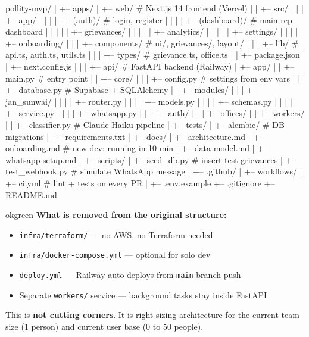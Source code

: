 \documentclass[12pt, a4paper]{article}
\begin{document}
\begin{treebox}
pollity-mvp/
|
+-- apps/
|   +-- web/                     # Next.js 14 frontend (Vercel)
|   |   +-- src/
|   |   |   +-- app/
|   |   |   |   +-- (auth)/      # login, register
|   |   |   |   +-- (dashboard)/ # main rep dashboard
|   |   |   |   |   +-- grievances/
|   |   |   |   |   +-- analytics/
|   |   |   |   |   +-- settings/
|   |   |   |   +-- onboarding/
|   |   |   +-- components/      # ui/, grievances/, layout/
|   |   |   +-- lib/             # api.ts, auth.ts, utils.ts
|   |   |   +-- types/           # grievance.ts, office.ts
|   |   +-- package.json
|   |   +-- next.config.js
|   |
|   +-- api/                     # FastAPI backend (Railway)
|       +-- app/
|       |   +-- main.py          # entry point
|       |   +-- core/
|       |   |   +-- config.py    # settings from env vars
|       |   |   +-- database.py  # Supabase + SQLAlchemy
|       |   +-- modules/
|       |   |   +-- jan_sunwai/
|       |   |   |   +-- router.py
|       |   |   |   +-- models.py
|       |   |   |   +-- schemas.py
|       |   |   |   +-- service.py
|       |   |   |   +-- whatsapp.py
|       |   |   +-- auth/
|       |   |   +-- offices/
|       |   +-- workers/
|       |       +-- classifier.py  # Claude Haiku pipeline
|       +-- tests/
|       +-- alembic/               # DB migrations
|       +-- requirements.txt
|
+-- docs/
|   +-- architecture.md
|   +-- onboarding.md            # new dev: running in 10 min
|   +-- data-model.md
|   +-- whatsapp-setup.md
|
+-- scripts/
|   +-- seed_db.py               # insert test grievances
|   +-- test_webhook.py          # simulate WhatsApp message
|
+-- .github/
|   +-- workflows/
|       +-- ci.yml               # lint + tests on every PR
|
+-- .env.example
+-- .gitignore
+-- README.md
\end{treebox}

\vspace{0.5em}

\begin{insightbox}{okgreen}
\textbf{What is removed from the original structure:}
\begin{itemize}[leftmargin=1.2em, itemsep=0.1em, topsep=0.2em]
    \item \texttt{infra/terraform/} --- no AWS, no Terraform needed
    \item \texttt{infra/docker-compose.yml} --- optional for solo dev
    \item \texttt{deploy.yml} --- Railway auto-deploys from \texttt{main} branch push
    \item Separate \texttt{workers/} service --- background tasks stay inside FastAPI
\end{itemize}
This is \textbf{not cutting corners}. It is right-sizing architecture for the current team size (1 person) and current user base (0 to 50 people).
\end{insightbox}
\end{document}
